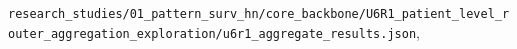 \documentclass[pdflatex,sn-nature]{sn-jnl}
\begin{document}
{\footnotesize\texttt{r\allowbreak{}e\allowbreak{}s\allowbreak{}e\allowbreak{}a\allowbreak{}r\allowbreak{}c\allowbreak{}h\allowbreak{}\_\allowbreak{}s\allowbreak{}t\allowbreak{}u\allowbreak{}d\allowbreak{}i\allowbreak{}e\allowbreak{}s\allowbreak{}/\allowbreak{}0\allowbreak{}1\allowbreak{}\_\allowbreak{}p\allowbreak{}a\allowbreak{}t\allowbreak{}t\allowbreak{}e\allowbreak{}r\allowbreak{}n\allowbreak{}\_\allowbreak{}s\allowbreak{}u\allowbreak{}r\allowbreak{}v\allowbreak{}\_\allowbreak{}h\allowbreak{}n\allowbreak{}/\allowbreak{}c\allowbreak{}o\allowbreak{}r\allowbreak{}e\allowbreak{}\_\allowbreak{}b\allowbreak{}a\allowbreak{}c\allowbreak{}k\allowbreak{}b\allowbreak{}o\allowbreak{}n\allowbreak{}e\allowbreak{}/\allowbreak{}U\allowbreak{}6\allowbreak{}R\allowbreak{}1\allowbreak{}\_\allowbreak{}p\allowbreak{}a\allowbreak{}t\allowbreak{}i\allowbreak{}e\allowbreak{}n\allowbreak{}t\allowbreak{}\_\allowbreak{}l\allowbreak{}e\allowbreak{}v\allowbreak{}e\allowbreak{}l\allowbreak{}\_\allowbreak{}r\allowbreak{}o\allowbreak{}u\allowbreak{}t\allowbreak{}e\allowbreak{}r\allowbreak{}\_\allowbreak{}a\allowbreak{}g\allowbreak{}g\allowbreak{}r\allowbreak{}e\allowbreak{}g\allowbreak{}a\allowbreak{}t\allowbreak{}i\allowbreak{}o\allowbreak{}n\allowbreak{}\_\allowbreak{}e\allowbreak{}x\allowbreak{}p\allowbreak{}l\allowbreak{}o\allowbreak{}r\allowbreak{}a\allowbreak{}t\allowbreak{}i\allowbreak{}o\allowbreak{}n\allowbreak{}/\allowbreak{}u\allowbreak{}6\allowbreak{}r\allowbreak{}1\allowbreak{}\_\allowbreak{}a\allowbreak{}g\allowbreak{}g\allowbreak{}r\allowbreak{}e\allowbreak{}g\allowbreak{}a\allowbreak{}t\allowbreak{}e\allowbreak{}\_\allowbreak{}r\allowbreak{}e\allowbreak{}s\allowbreak{}u\allowbreak{}l\allowbreak{}t\allowbreak{}s\allowbreak{}.\allowbreak{}j\allowbreak{}s\allowbreak{}o\allowbreak{}n}}, 
\end{document}

